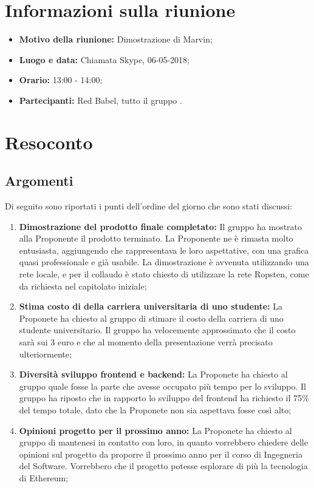 \documentclass[VER-2018-05-06.tex]{subfiles}
\begin{document}
	

\chapter{Informazioni sulla riunione}
\begin{itemize}
	\item \textbf{Motivo della riunione:} Dimostrazione di Marvin;
	\item \textbf{Luogo e data:} Chiamata Skype, 06-05-2018;
	\item \textbf{Orario:} 13:00 - 14:00;
	\item \textbf{Partecipanti:} Red Babel, tutto il gruppo \gruppo.
\end{itemize}



\chapter{Resoconto}
\section{Argomenti}
Di seguito sono riportati i punti dell'ordine del giorno che sono stati discussi:
\begin{enumerate}
	\item \textbf{Dimostrazione del prodotto finale completato:} Il gruppo ha mostrato alla Proponente il prodotto terminato. La Proponente ne è rimasta molto entusiasta, aggiungendo che rappresentava le loro aspettative, con una grafica quasi professionale e già usabile. La dimostrazione è avvenuta utilizzando una rete locale, e per il collaudo è stato chiesto di utilizzare la rete Ropsten, come da richiesta nel capitolato iniziale;
	\item \textbf{Stima costo di della carriera universitaria di uno studente:} La Proponete ha chiesto al gruppo di stimare il costo della carriera di uno studente universitario. Il gruppo ha velocemente approssimato che il costo sarà sui 3 euro e che al momento della presentazione verrà precisato ulteriormente;
	\item \textbf{Diversità sviluppo frontend e backend:} La Proponete ha chiesto al gruppo quale fosse la parte che avesse occupato più tempo per lo sviluppo. Il gruppo ha riposto che in rapporto lo sviluppo del frontend ha richiesto il 75\% del tempo totale, dato che la  Proponete non sia aspettava fosse così alto;
	\item \textbf{Opinioni progetto per il prossimo anno:} La Proponete ha chiesto al gruppo di mantenesi in contatto con loro, in quanto vorrebbero chiedere delle opinioni sul progetto da proporre il prossimo anno per il corso di Ingegneria del Software. Vorrebbero che il progetto potesse esplorare di più la tecnologia di Ethereum;
\end{enumerate}
\end{document}
